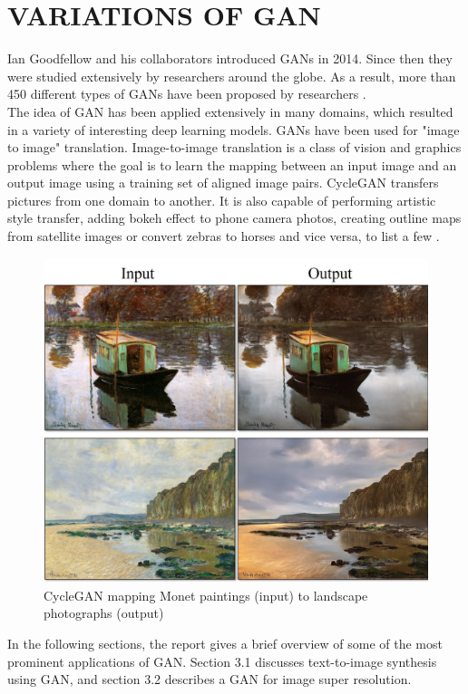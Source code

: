 \chapter{VARIATIONS OF GAN}
\begin{onehalfspace}
    Ian Goodfellow and his collaborators introduced GANs in 2014. Since then 
    they were studied extensively by researchers around the globe. As a result, 
    more than 450 different types of GANs have been proposed by 
    researchers \cite{gan_list}. \\
    The idea of GAN has been applied extensively in many domains, which 
    resulted in a variety of interesting deep learning models. GANs have been 
    used for "image to image" translation. Image-to-image translation is a 
    class of vision and graphics problems where the goal is to learn the 
    mapping between an input image and an output image using a training set of 
    aligned image pairs. CycleGAN \cite{CycleGAN2017} transfers pictures from 
    one domain to another. 
    It is also capable of performing artistic style transfer, adding bokeh 
    effect to phone camera photos, creating outline maps from satellite images 
    or convert zebras to horses and vice versa, to list a few 
    \cite{cycleganprojectpage}.

    \begin{figure}[h]
        \centering
        \includegraphics[width=0.6\linewidth]{images/painting2photo.jpg}
        \caption{CycleGAN mapping Monet paintings (input) to landscape photographs (output)
        \cite{cycleganprojectpage}}
    \end{figure} 

    In the following sections, the report gives a brief overview of 
    some of the most prominent applications of GAN. Section 3.1 discusses 
    text-to-image synthesis using GAN, and section 3.2 describes a GAN for 
    image super resolution.


\end{onehalfspace}
